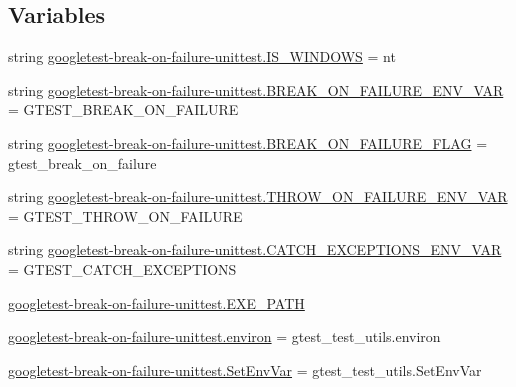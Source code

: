 \subsection*{Variables}
\begin{DoxyCompactItemize}
\item 
string \mbox{\hyperlink{namespacegoogletest-break-on-failure-unittest_ad469d79d1ae4ec7b533fd0730b609b94}{googletest-\/break-\/on-\/failure-\/unittest.\+I\+S\+\_\+\+W\+I\+N\+D\+O\+WS}} = \textquotesingle{}nt\textquotesingle{}
\item 
string \mbox{\hyperlink{namespacegoogletest-break-on-failure-unittest_a0a0edcc8d01e52d3b470c0a68ff9e974}{googletest-\/break-\/on-\/failure-\/unittest.\+B\+R\+E\+A\+K\+\_\+\+O\+N\+\_\+\+F\+A\+I\+L\+U\+R\+E\+\_\+\+E\+N\+V\+\_\+\+V\+AR}} = \textquotesingle{}G\+T\+E\+S\+T\+\_\+\+B\+R\+E\+A\+K\+\_\+\+O\+N\+\_\+\+F\+A\+I\+L\+U\+RE\textquotesingle{}
\item 
string \mbox{\hyperlink{namespacegoogletest-break-on-failure-unittest_ad69f46d5516e732644b38113adcc2847}{googletest-\/break-\/on-\/failure-\/unittest.\+B\+R\+E\+A\+K\+\_\+\+O\+N\+\_\+\+F\+A\+I\+L\+U\+R\+E\+\_\+\+F\+L\+AG}} = \textquotesingle{}gtest\+\_\+break\+\_\+on\+\_\+failure\textquotesingle{}
\item 
string \mbox{\hyperlink{namespacegoogletest-break-on-failure-unittest_a5eefbed4865e8a71c4bdbd5ecb016f53}{googletest-\/break-\/on-\/failure-\/unittest.\+T\+H\+R\+O\+W\+\_\+\+O\+N\+\_\+\+F\+A\+I\+L\+U\+R\+E\+\_\+\+E\+N\+V\+\_\+\+V\+AR}} = \textquotesingle{}G\+T\+E\+S\+T\+\_\+\+T\+H\+R\+O\+W\+\_\+\+O\+N\+\_\+\+F\+A\+I\+L\+U\+RE\textquotesingle{}
\item 
string \mbox{\hyperlink{namespacegoogletest-break-on-failure-unittest_a468320485c68ba6a8020136151233943}{googletest-\/break-\/on-\/failure-\/unittest.\+C\+A\+T\+C\+H\+\_\+\+E\+X\+C\+E\+P\+T\+I\+O\+N\+S\+\_\+\+E\+N\+V\+\_\+\+V\+AR}} = \textquotesingle{}G\+T\+E\+S\+T\+\_\+\+C\+A\+T\+C\+H\+\_\+\+E\+X\+C\+E\+P\+T\+I\+O\+NS\textquotesingle{}
\item 
\mbox{\hyperlink{namespacegoogletest-break-on-failure-unittest_a03b507a984f7e7076a3aa3ed3548bdc8}{googletest-\/break-\/on-\/failure-\/unittest.\+E\+X\+E\+\_\+\+P\+A\+TH}}
\item 
\mbox{\hyperlink{namespacegoogletest-break-on-failure-unittest_ada5297aa07c010145fcb4df402ab713d}{googletest-\/break-\/on-\/failure-\/unittest.\+environ}} = gtest\+\_\+test\+\_\+utils.\+environ
\item 
\mbox{\hyperlink{namespacegoogletest-break-on-failure-unittest_abc1b16aef18f9120cbfa46f044a8b05e}{googletest-\/break-\/on-\/failure-\/unittest.\+Set\+Env\+Var}} = gtest\+\_\+test\+\_\+utils.\+Set\+Env\+Var
\end{DoxyCompactItemize}
